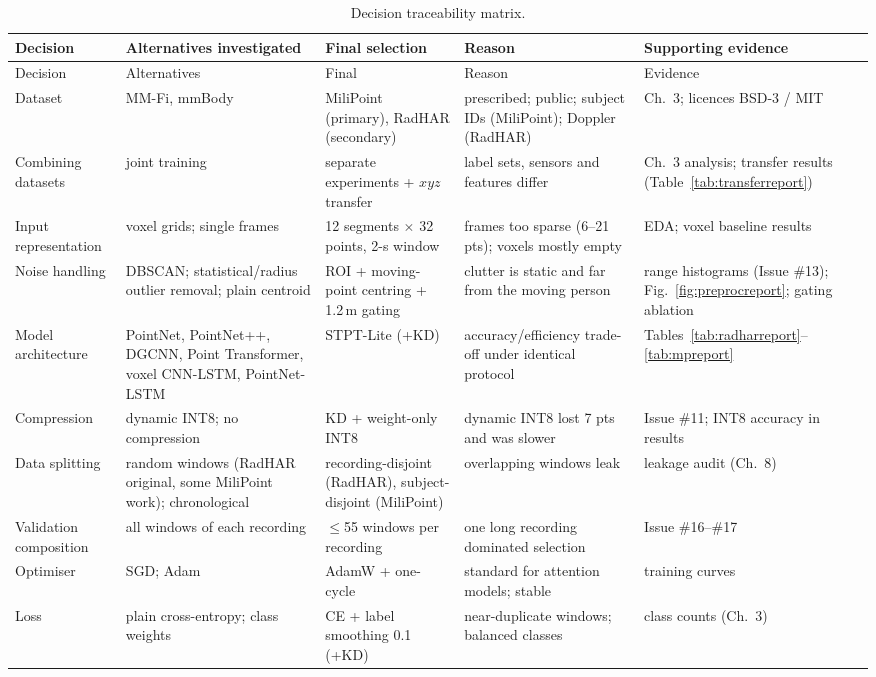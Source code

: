 \begin{longtable}{L{2.0cm}L{3.2cm}L{2.6cm}L{3.4cm}L{3.0cm}}
\caption{Decision traceability matrix.}\label{tab:trace}\\
\toprule
Decision & Alternatives investigated & Final selection & Reason & Supporting evidence \\
\midrule\endfirsthead
\toprule Decision & Alternatives & Final & Reason & Evidence \\ \midrule\endhead
Dataset & MM-Fi, mmBody & MiliPoint (primary), RadHAR (secondary) & prescribed; public; subject IDs (MiliPoint); Doppler (RadHAR) & Ch.~3; licences BSD-3 / MIT \\
Combining datasets & joint training & separate experiments + $xyz$ transfer & label sets, sensors and features differ & Ch.~3 analysis; transfer results (Table~\ref{tab:transferreport}) \\
Input representation & voxel grids; single frames & 12 segments $\times$ 32 points, 2-s window & frames too sparse (6--21 pts); voxels mostly empty & EDA; voxel baseline results \\
Noise handling & DBSCAN; statistical/radius outlier removal; plain centroid & ROI + moving-point centring + 1.2\,m gating & clutter is static and far from the moving person & range histograms (Issue \#13); Fig.~\ref{fig:preprocreport}; gating ablation \\
Model architecture & PointNet, PointNet++, DGCNN, Point Transformer, voxel CNN-LSTM, PointNet-LSTM & STPT-Lite (+KD) & accuracy/efficiency trade-off under identical protocol & Tables~\ref{tab:radharreport}--\ref{tab:mpreport} \\
Compression & dynamic INT8; no compression & KD + weight-only INT8 & dynamic INT8 lost 7 pts and was slower & Issue \#11; INT8 accuracy in results \\
Data splitting & random windows (RadHAR original, some MiliPoint work); chronological & recording-disjoint (RadHAR), subject-disjoint (MiliPoint) & overlapping windows leak & leakage audit (Ch.~8) \\
Validation composition & all windows of each recording & $\leq$55 windows per recording & one long recording dominated selection & Issue \#16--\#17 \\
Optimiser & SGD; Adam & AdamW + one-cycle & standard for attention models; stable & training curves \\
Loss & plain cross-entropy; class weights & CE + label smoothing 0.1 (+KD) & near-duplicate windows; balanced classes & class counts (Ch.~3) \\

\end{longtable}
